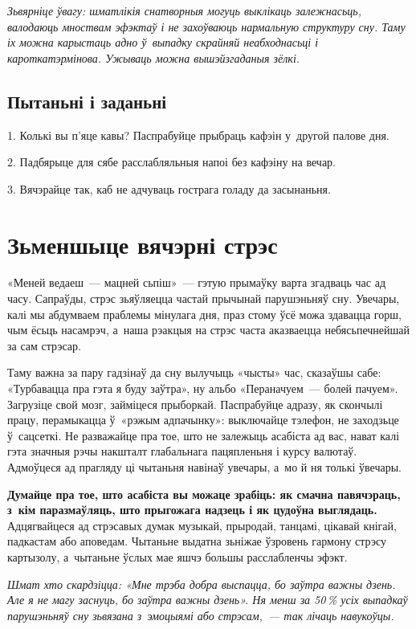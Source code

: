 \emph{Зьвярніце ўвагу: шматлікія снатворныя могуць выклікаць залежнасьць, валодаюць мноствам эфэктаў і не захоўваюць нармальную структуру сну. Таму іх можна карыстаць адно ў~выпадку скрайняй неабходнасьці і кароткатэрмінова. Ужываць можна вышэйзгаданыя зёлкі.}

\subsection*{Пытаньні і заданьні}

1. Колькі вы п'яце кавы? Паспрабуйце прыбраць кафэін у~другой палове дня.

2. Падбярыце для сябе расслабляльныя напоі без кафэіну на вечар.

3. Вячэрайце так, каб не адчуваць гострага голаду да засынаньня.


\section{Зьменшыце вячэрні стрэс}

«Меней ведаеш~--- мацней сьпіш»~--- гэтую прымаўку варта згадваць час ад часу. Сапраўды, стрэс зьяўляецца частай прычынай парушэньняў сну. Увечары, калі мы абдумваем праблемы мінулага дня, праз стому ўсё можа здавацца горш, чым ёсьць насамрэч, а~наша рэакцыя на стрэс часта аказваецца небясьпечнейшай за сам стрэсар. 


Таму важна за пару гадзінаў да сну вылучыць «чысты» час, сказаўшы сабе: «Турбавацца пра гэта я буду заўтра», ну альбо «Пераначуем~--- болей пачуем». Загрузіце свой мозг, займіцеся прыборкай. Паспрабуйце адразу, як скончылі працу, перамыкацца ў~«рэжым адпачынку»: выключайце тэлефон, не заходзьце ў~сацсеткі. Не разважайце пра тое, што не залежыць асабіста ад вас, нават калі гэта значныя рэчы накшталт глабальнага пацяпленьня і курсу валютаў. Адмоўцеся ад прагляду ці чытаньня навінаў увечары, а~мо й ня толькі ўвечары.

\textbf{Думайце пра тое, што асабіста вы можаце зрабіць: як смачна павячэраць, з~кім паразмаўляць, што прыгожага надзець і як цудоўна выглядаць.} Адцягвайцеся ад стрэсавых думак музыкай, прыродай, танцамі, цікавай кнігай, падкастам або аповедам. Чытаньне выдатна зьніжае ўзровень гармону стрэсу картызолу, а~чытаньне ўслых мае яшчэ большы расслабленчы эфэкт.

\emph{Шмат хто скардзіцца: «Мне трэба добра выспацца, бо заўтра важны дзень. Але я не магу заснуць, бо заўтра важны дзень». Ня менш за 50\,\% усіх выпадкаў парушэньняў сну зьвязана з~эмоцыямі або стрэсам,~--- так лічаць навукоўцы.}

